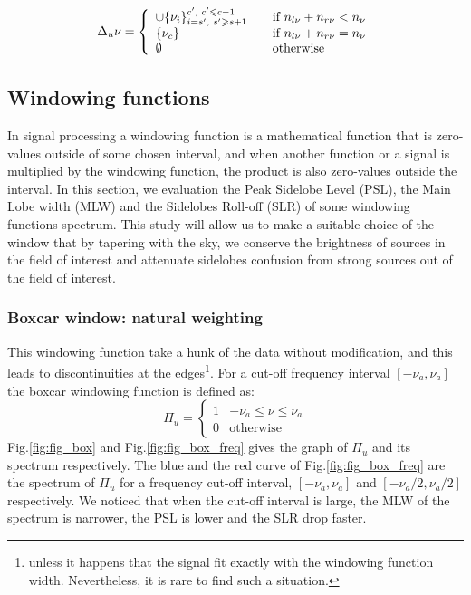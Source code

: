 \documentclass[useAMS,usenatbib]{mn2e}
\begin{document}
\begin{eqnarray*}
 \Delta_u \nu= \left\{ 
  \begin{array}{l l}
     \cup\{\nu_i\}_{i=s',\hspace{0.1cm} s'\geq s+1}^{c', \hspace{0.1cm}c'\leq c-1} & \quad \text{if $n_{l\nu}+n_{r\nu} < n_{\nu}$}\\
      \{\nu_c\}& \quad \text{if $n_{l\nu}+n_{r\nu} = n_{\nu}$}\\
       \emptyset  & \quad \text{otherwise}
  \end{array} \right.
\end{eqnarray*}
\subsection{Windowing functions}
\label{subsec:Windowing functions}
In signal processing a windowing function is a mathematical function that is zero-values outside of some chosen interval, and when another 
function or a signal is multiplied by the windowing function, the product is also zero-values outside the interval.
In this section, we evaluation the Peak Sidelobe Level (PSL), the Main 
Lobe width (MLW) and the Sidelobes Roll-off (SLR) of some windowing functions spectrum. This study will allow us to make 
a suitable choice of the window that by tapering with the sky, we conserve the brightness of sources in the field of 
interest and attenuate sidelobes confusion from strong sources out of the field of interest.
\subsubsection{Boxcar window: natural weighting}
This windowing function take a hunk of the data without modification, and  this leads to discontinuities at the edges\footnote{unless it 
happens that the signal  fit exactly with the windowing function width. Nevertheless, it is rare to find such a situation.}. For 
a cut-off frequency interval  $[-\nu_a,\nu_a]$ the boxcar windowing function is defined as:
\begin{equation}
\Pi_{u}=\left\{
\begin{array}{rl}
1 & \mbox{$-\nu_a \leq \nu \leq \nu_a$} \\
0 & \mbox{otherwise}
\end{array}\right.
\end{equation}
Fig.\ref{fig:fig_box} and Fig.\ref{fig:fig_box_freq} gives the graph of $\Pi_{u}$ and its spectrum respectively. The blue and 
the red curve of Fig.\ref{fig:fig_box_freq} are the spectrum of $\Pi_{u}$ for a frequency cut-off interval, $[-\nu_a,\nu_a]$ and 
$[-\nu_a/2,\nu_a/2]$ respectively. We noticed that when the cut-off interval is large, the MLW of the spectrum is 
narrower, the PSL is lower and the SLR drop faster. 
\end{document}
